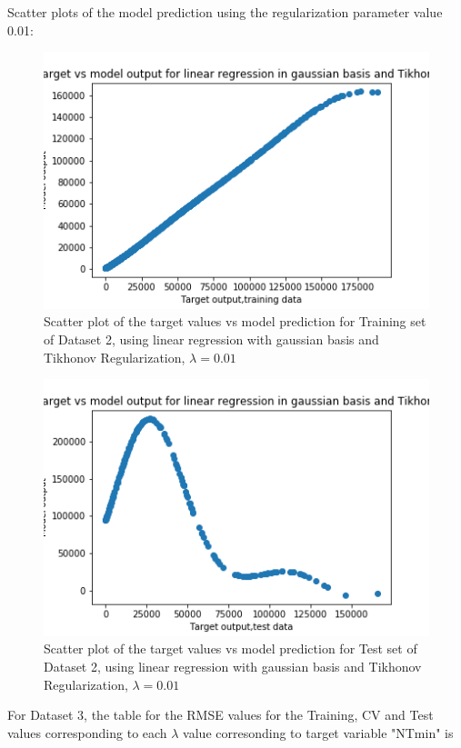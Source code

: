 \documentclass[12pt,a4paper]{article}
\newcommand{\noi}{\noindent}
\begin{document}
\noi
Scatter plots of the model prediction using the regularization parameter value 0.01:
\begin{figure}[H]
     \centering
     \includegraphics[scale=0.5]{images/scatter_ds2tikhtr.png}
     \caption{Scatter plot of the target values vs model prediction for Training set of Dataset 2, using linear regression with gaussian basis and Tikhonov Regularization, $\lambda = 0.01 $}
\end{figure}
\begin{figure}[H]
     \centering
     \includegraphics[scale=0.5]{images/scatter_ds2tikhtest.png}
     \caption{Scatter plot of the target values vs model prediction for Test set of Dataset 2, using linear regression with gaussian basis and Tikhonov Regularization, $\lambda = 0.01 $}
\end{figure}

 \noi
For Dataset 3, the table for the RMSE values for the Training, CV and Test values corresponding to each $\lambda$ value corresonding to target variable "NTmin" is\\

\end{document}
